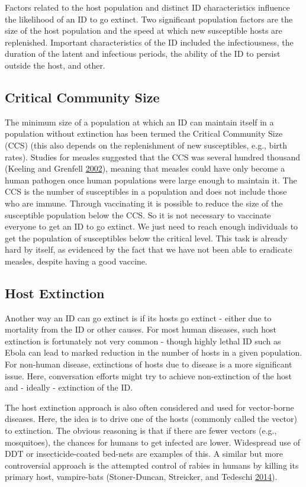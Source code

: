 \documentclass[]{article}
\theoremstyle{definition}
\theoremstyle{definition}
\theoremstyle{definition}
\theoremstyle{remark}
\begin{document}
Factors related to the host population and distinct ID characteristics
influence the likelihood of an ID to go extinct. Two significant
population factors are the size of the host population and the speed at
which new susceptible hosts are replenished. Important characteristics
of the ID included the infectiousness, the duration of the latent and
infectious periods, the ability of the ID to persist outside the host,
and other.

\subsection{Critical Community Size}\label{critical-community-size}

The minimum size of a population at which an ID can maintain itself in a
population without extinction has been termed the Critical Community
Size (CCS) (this also depends on the replenishment of new susceptibles,
e.g., birth rates). Studies for measles suggested that the CCS was
several hundred thousand (Keeling and Grenfell
\protect\hyperlink{ref-keeling02}{2002}), meaning that measles could
have only become a human pathogen once human populations were large
enough to maintain it. The CCS is the number of susceptibles in a
population and does not include those who are immune. Through
vaccinating it is possible to reduce the size of the susceptible
population below the CCS. So it is not necessary to vaccinate everyone
to get an ID to go extinct. We just need to reach enough individuals to
get the population of susceptibles below the critical level. This task
is already hard by itself, as evidenced by the fact that we have not
been able to eradicate measles, despite having a good vaccine.

\subsection{Host Extinction}\label{host-extinction}

Another way an ID can go extinct is if its hosts go extinct - either due
to mortality from the ID or other causes. For most human diseases, such
host extinction is fortunately not very common - though highly lethal ID
such as Ebola can lead to marked reduction in the number of hosts in a
given population. For non-human disease, extinctions of hosts due to
disease is a more significant issue. Here, conversation efforts might
try to achieve non-extinction of the host and - ideally - extinction of
the ID.

The host extinction approach is also often considered and used for
vector-borne diseases. Here, the idea is to drive one of the hosts
(commonly called the vector) to extinction. The obvious reasoning is
that if there are fewer vectors (e.g., mosquitoes), the chances for
humans to get infected are lower. Widespread use of DDT or
insecticide-coated bed-nets are examples of this. A similar but more
controversial approach is the attempted control of rabies in humans by
killing its primary host, vampire-bats (Stoner-Duncan, Streicker, and
Tedeschi \protect\hyperlink{ref-stoner-duncan14}{2014}).
\end{document}
